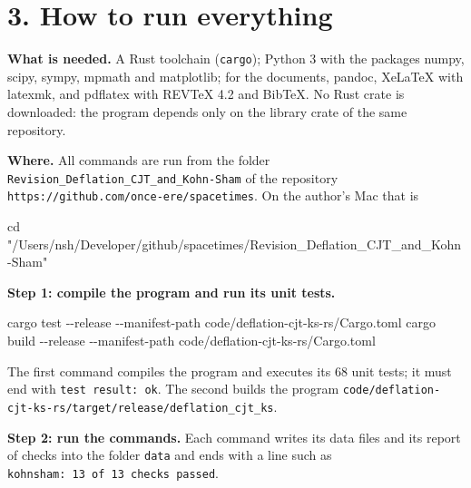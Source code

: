 \documentclass[
  10pt,
]{article}
\newenvironment{Shaded}{}{}
\newcommand{\AttributeTok}[1]{\textcolor[rgb]{0.49,0.56,0.16}{#1}}
\newcommand{\BuiltInTok}[1]{\textcolor[rgb]{0.00,0.50,0.00}{#1}}
\newcommand{\ControlFlowTok}[1]{\textcolor[rgb]{0.00,0.44,0.13}{\textbf{#1}}}
\newcommand{\DataTypeTok}[1]{\textcolor[rgb]{0.56,0.13,0.00}{#1}}
\newcommand{\ExtensionTok}[1]{#1}
\newcommand{\KeywordTok}[1]{\textcolor[rgb]{0.00,0.44,0.13}{\textbf{#1}}}
\newcommand{\NormalTok}[1]{#1}
\newcommand{\OperatorTok}[1]{\textcolor[rgb]{0.40,0.40,0.40}{#1}}
\newcommand{\StringTok}[1]{\textcolor[rgb]{0.25,0.44,0.63}{#1}}
\newcommand{\VariableTok}[1]{\textcolor[rgb]{0.10,0.09,0.49}{#1}}
\begin{document}
\hypertarget{how-to-run-everything}{%
\section{3. How to run everything}\label{how-to-run-everything}}

\textbf{What is needed.} A Rust toolchain (\texttt{cargo}); Python 3
with the packages numpy, scipy, sympy, mpmath and matplotlib; for the
documents, pandoc, XeLaTeX with latexmk, and pdflatex with REVTeX 4.2
and BibTeX. No Rust crate is downloaded: the program depends only on the
library crate of the same repository.

\textbf{Where.} All commands are run from the folder
\texttt{Revision\_Deflation\_CJT\_and\_Kohn-Sham} of the repository
\texttt{https://github.com/once-ere/spacetimes}. On the author's Mac
that is

\begin{Shaded}
\begin{Highlighting}[]
\BuiltInTok{cd} \StringTok{"/Users/nsh/Developer/github/spacetimes/Revision\_Deflation\_CJT\_and\_Kohn{-}Sham"}
\end{Highlighting}
\end{Shaded}

\textbf{Step 1: compile the program and run its unit tests.}

\begin{Shaded}
\begin{Highlighting}[]
\ExtensionTok{cargo}\NormalTok{ test  }\AttributeTok{{-}{-}release} \AttributeTok{{-}{-}manifest{-}path}\NormalTok{ code/deflation{-}cjt{-}ks{-}rs/Cargo.toml}
\ExtensionTok{cargo}\NormalTok{ build }\AttributeTok{{-}{-}release} \AttributeTok{{-}{-}manifest{-}path}\NormalTok{ code/deflation{-}cjt{-}ks{-}rs/Cargo.toml}
\end{Highlighting}
\end{Shaded}

The first command compiles the program and executes its 68 unit tests;
it must end with \texttt{test\ result:\ ok}. The second builds the
program
\texttt{code/deflation-cjt-ks-rs/target/release/deflation\_cjt\_ks}.

\textbf{Step 2: run the commands.} Each command writes its data files
and its report of checks into the folder \texttt{data} and ends with a
line such as \texttt{kohnsham:\ 13\ of\ 13\ checks\ passed}.

\begin{Shaded}
\end{Shaded}
\end{document}
